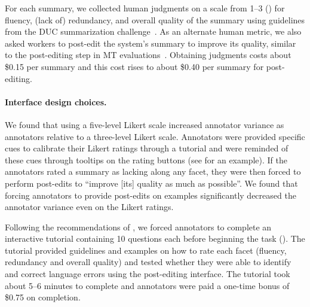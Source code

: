 For each summary, we collected human judgments on a scale from 1--3 () for fluency, (lack of) redundancy, and overall quality of the summary using guidelines from the DUC summarization challenge~\citep{dang2006overview}.
As an alternate human metric, we also asked workers to post-edit the system's summary to improve its quality, similar to the post-editing step in MT evaluations~\citep{snover2006ter}.
Obtaining judgments costs about \$0.15 per summary and this cost rises to about \$0.40 per summary for post-editing.

\paragraph{Interface design choices.}
We found that using a five-level Likert scale increased annotator variance as annotators relative to a three-level Likert scale.
Annotators were provided specific cues to calibrate their Likert ratings through a tutorial and were reminded of these cues through tooltips on the rating buttons (see  for an example).
If the annotators rated a summary as lacking along any facet, they were then forced to perform post-edits to ``improve [its] quality as much as possible''.
We found that forcing annotators to provide post-edits on examples significantly decreased the annotator variance even on the Likert ratings.

Following the recommendations of \citet{liu2016effective}, we forced annotators to complete an interactive tutorial containing 10 questions each before beginning the task ().
The tutorial provided guidelines and examples on how to rate each facet (fluency, redundancy and overall quality) and tested whether they were able to identify and correct language errors using the post-editing interface.
The tutorial took about 5--6 minutes to complete and annotators were paid a one-time bonus of \$0.75 on completion.

